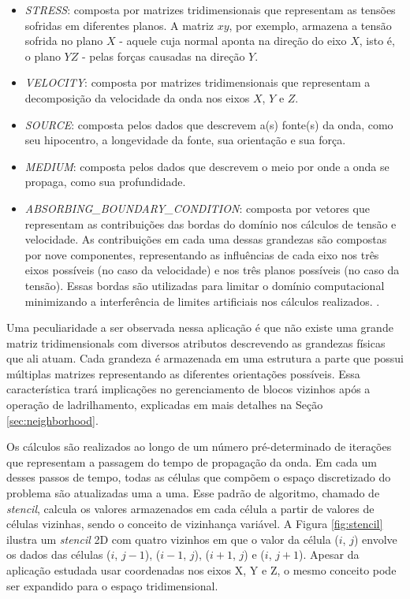 \documentclass[cic,tc]{iiufrgs}
\begin{document}
\begin{itemize}
\item{\textit{STRESS}:} composta por matrizes tridimensionais que representam as tensões sofridas em diferentes planos. A matriz $xy$, por exemplo, armazena a tensão sofrida no plano
  $X$ - aquele cuja normal aponta na direção do eixo $X$, isto é, o plano $YZ$ - pelas forças causadas na direção $Y$.
\item{\textit{VELOCITY}:} composta por matrizes tridimensionais que representam a decomposição da velocidade da onda nos eixos $X$, $Y$ e $Z$.
\item{\textit{SOURCE}:} composta pelos dados que descrevem a(s) fonte(s) da onda, como seu hipocentro, a longevidade da fonte, sua orientação e sua força.
\item{\textit{MEDIUM}:} composta pelos dados que descrevem o meio por onde a onda se propaga, como sua profundidade.
\item{\textit{ABSORBING\_BOUNDARY\_CONDITION}:} composta por vetores que representam as contribuições das bordas do domínio nos cálculos
  de tensão e velocidade. As contribuições em cada uma dessas grandezas são compostas por nove componentes, representando as influências de
  cada eixo nos três eixos possíveis (no caso da velocidade) e nos três planos possíveis (no caso da tensão). Essas bordas são utilizadas
  para limitar o domínio computacional minimizando a interferência de limites artificiais nos cálculos realizados. \cite{ABCarticle}. 
\end{itemize}

Uma peculiaridade a ser observada nessa aplicação é que não existe uma grande matriz tridimensionals com diversos atributos descrevendo as grandezas físicas que ali atuam. Cada grandeza é armazenada em uma estrutura a parte que possui múltiplas matrizes representando as diferentes orientações possíveis. Essa característica trará implicações no gerenciamento de blocos
vizinhos após a operação de ladrilhamento, explicadas em mais detalhes na Seção \ref{sec:neighborhood}.

Os cálculos são realizados ao longo de um número pré-determinado de iterações que representam a passagem do tempo de propagação da onda.
Em cada um desses passos de tempo, todas as células que compõem o espaço discretizado do problema são atualizadas uma a uma. Esse
padrão de algoritmo, chamado de \textit{stencil}, calcula os valores armazenados em cada célula a partir de valores de células vizinhas, sendo o conceito de vizinhança variável. A Figura
\ref{fig:stencil} ilustra um \textit{stencil} 2D com quatro vizinhos em que o valor da célula ($i$, $j$) envolve os dados das células ($i$, $j-1$), ($i-1$, $j$), ($i+1$, $j$) e ($i$, $j+1$).
Apesar da aplicação estudada usar coordenadas nos eixos X, Y e Z, o mesmo conceito pode ser expandido para o espaço tridimensional.
\end{document}
